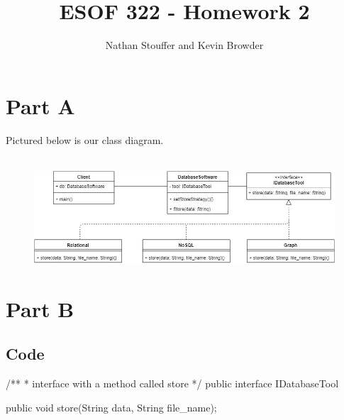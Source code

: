 \documentclass{article}
\begin{document}
	
\title{ESOF 322 - Homework 2}
\author{Nathan Stouffer and Kevin Browder}

\maketitle
\newpage

\section*{Part A}

Pictured below is our class diagram. \\\\
\begin{figure}[h]
	\centering
	\includegraphics[scale=.5]{class-diagram.jpg}
\end{figure}

\newpage

\section*{Part B}

\subsection*{Code}

\begin{spverbatim}
	/**
	* interface with a method called store
	*/
	public interface IDatabaseTool {
		
	    public void store(String data, String file_name);
		
	}
\end{spverbatim}

\newpage
\end{document}

